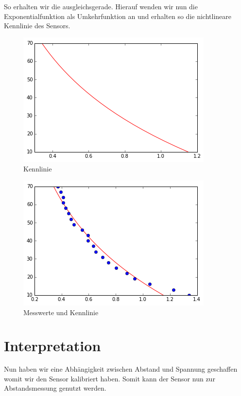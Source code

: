 \documentclass[TGAI_Laborbericht.tex]{subfiles}
\begin{document}
 So erhalten wir die ausgleichsgerade. Hierauf wenden wir nun die Exponentialfunktion als  Umkehrfunktion an und erhalten so die nichtlineare Kennlinie des Sensors. 
 \begin{figure}[H]
\includegraphics[]{media/finalf.png}
\caption{Kennlinie}
\end{figure}

\begin{figure}[H]
\includegraphics[]{media/messwerte&finalf.png}
\caption{Messwerte und Kennlinie}
\end{figure}

\section{Interpretation}
\label{chap:VERSUCH_2_INTERPRETATION}
Nun haben wir eine Abhängigkeit zwischen Abstand und Spannung geschaffen womit wir den Sensor kalibriert haben. Somit kann der Sensor nun zur Abstandsmessung genutzt werden.
\end{document}
